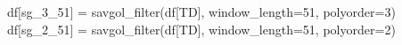\documentclass[
  letterpaper,
  DIV=11,
  numbers=noendperiod,
  oneside]{scrreprt}
\newenvironment{Shaded}{\begin{snugshade}}{\end{snugshade}}
\newcommand{\DecValTok}[1]{\textcolor[rgb]{0.68,0.00,0.00}{#1}}
\newcommand{\NormalTok}[1]{\textcolor[rgb]{0.00,0.23,0.31}{#1}}
\newcommand{\OperatorTok}[1]{\textcolor[rgb]{0.37,0.37,0.37}{#1}}
\newcommand{\StringTok}[1]{\textcolor[rgb]{0.13,0.47,0.30}{#1}}
\begin{document}
\begin{Shaded}
\begin{Highlighting}[]
\NormalTok{df[}\StringTok{\textquotesingle{}sg\_3\_51\textquotesingle{}}\NormalTok{] }\OperatorTok{=}\NormalTok{ savgol\_filter(df[}\StringTok{\textquotesingle{}TD\textquotesingle{}}\NormalTok{], window\_length}\OperatorTok{=}\DecValTok{51}\NormalTok{, polyorder}\OperatorTok{=}\DecValTok{3}\NormalTok{)}
\NormalTok{df[}\StringTok{\textquotesingle{}sg\_2\_51\textquotesingle{}}\NormalTok{] }\OperatorTok{=}\NormalTok{ savgol\_filter(df[}\StringTok{\textquotesingle{}TD\textquotesingle{}}\NormalTok{], window\_length}\OperatorTok{=}\DecValTok{51}\NormalTok{, polyorder}\OperatorTok{=}\DecValTok{2}\NormalTok{)}
\end{Highlighting}
\end{Shaded}
\end{document}
